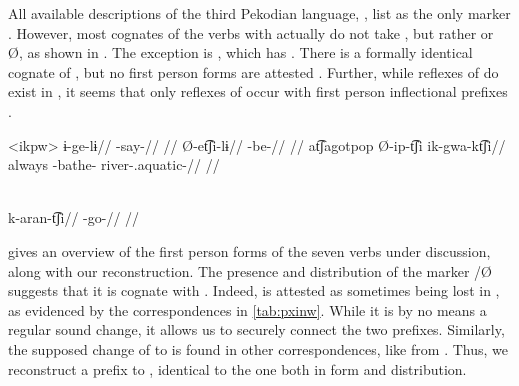All available descriptions of the third Pekodian language, \ikpeng, list  as the only  marker \parencites[55]{ikpengpacheco1997}[105]{campetela1997analise}[64]{ikpengpacheco2001}[205]{alves2013verbo}.
However, most \ikpeng cognates of the \arara verbs with   actually do not take , but rather  or Ø, as shown in .
The exception is , which has  .
There is a formally identical \ikpeng cognate of \arara {} , but no first person forms are attested .
Further, while reflexes of   do exist in \ikpeng, it seems that only reflexes of  occur with first person inflectional prefixes \parencite[401]{gildea2018reconstructing}.

\pex<ikpw>\ikpeng
{}
\begingl
\gla ɨ-ge-lɨ//
\glb {}-say-//
\glft {} \parencite[][209]{ikpengpacheco2001}//
\endgl
{}
\begingl
\gla Ø-et͡ʃi-lɨ//
\glb {}-be-//
\glft {} \parencite[][139]{ikpengpacheco2001}//
\endgl
{}
\begingl
\gla at͡ʃagotpop Ø-ip-t͡ʃi ik-gwa-kt͡ʃi//
\glb always -bathe- river-.aquatic-//
\glft {} \parencite[][68]{ikpengpacheco1997}//
\endgl
\xe

\ikpeng \parencite[][80]{ikpengpacheco2001}\\
\begingl
\gla k-aran-t͡ʃi//
\glb {}-go-//
\glft {}//
\endgl
\xe



 gives an overview of the first person forms of the seven verbs under discussion, along with our \PPek reconstruction.
The presence and distribution of the \ikpeng {} marker /Ø suggests that it is cognate with \arara {} .
Indeed, \PXin {} is attested as sometimes being lost in \ikpeng, as evidenced by the correspondences in \cref{tab:pxinw}.
While it is by no means a regular sound change, it allows us to securely connect the two prefixes.
Similarly, the supposed change of  to \bakairi {} is found in other correspondences, like  \parencite{meira2005southern} from \PC {}  \parencite[4]{gildea2007greenberg}.
Thus, we reconstruct a  prefix  to \PPek, identical to the \arara one both in form and distribution.

